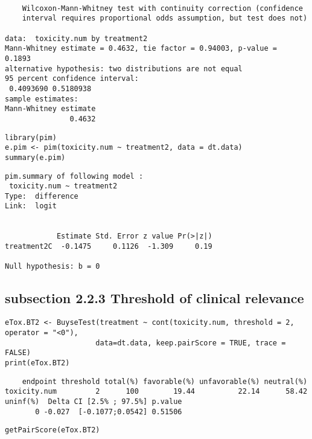 \documentclass[12pt]{article}
\begin{document}
\begin{verbatim}

	Wilcoxon-Mann-Whitney test with continuity correction (confidence
	interval requires proportional odds assumption, but test does not)

data:  toxicity.num by treatment2
Mann-Whitney estimate = 0.4632, tie factor = 0.94003, p-value =
0.1893
alternative hypothesis: two distributions are not equal
95 percent confidence interval:
 0.4093690 0.5180938
sample estimates:
Mann-Whitney estimate 
               0.4632
\end{verbatim}


\lstset{language=r,label= ,caption= ,captionpos=b,numbers=none}
\begin{lstlisting}
library(pim)
e.pim <- pim(toxicity.num ~ treatment2, data = dt.data)
summary(e.pim)
\end{lstlisting}

\begin{verbatim}
pim.summary of following model : 
 toxicity.num ~ treatment2
Type:  difference 
Link:  logit 


            Estimate Std. Error z value Pr(>|z|)
treatment2C  -0.1475     0.1126  -1.309     0.19

Null hypothesis: b = 0
\end{verbatim}

\subsection{subsection 2.2.3 Threshold of clinical relevance}
\label{sec:orgae49a35}

\lstset{language=r,label= ,caption= ,captionpos=b,numbers=none}
\begin{lstlisting}
eTox.BT2 <- BuyseTest(treatment ~ cont(toxicity.num, threshold = 2, operator = "<0"),
                     data=dt.data, keep.pairScore = TRUE, trace = FALSE)
print(eTox.BT2)
\end{lstlisting}

\begin{verbatim}
    endpoint threshold total(%) favorable(%) unfavorable(%) neutral(%)
toxicity.num         2      100        19.44          22.14      58.42
uninf(%)  Delta CI [2.5% ; 97.5%] p.value
       0 -0.027  [-0.1077;0.0542] 0.51506
\end{verbatim}



\lstset{language=r,label= ,caption= ,captionpos=b,numbers=none}
\begin{lstlisting}
getPairScore(eTox.BT2)
\end{lstlisting}
\end{document}
